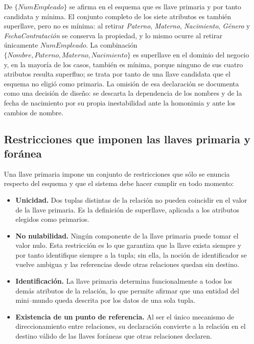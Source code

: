 De $\{N\acute{u}mEmpleado\}$ se afirma en el esquema que es llave primaria y
por tanto candidata y mínima. El conjunto completo de los siete atributos es
también superllave, pero no es mínima: al retirar \emph{Paterno},
\emph{Materno}, \emph{Nacimiento}, \emph{G\'enero} y
\emph{FechaContrataci\'on} se conserva la propiedad, y lo mismo ocurre al
retirar únicamente $N\acute{u}mEmpleado$. La combinación $\{Nombre, Paterno,
Materno, Nacimiento\}$ es superllave en el dominio del negocio y, en la
mayoría de los casos, también es mínima, porque ninguno de sus cuatro
atributos resulta superfluo; se trata por tanto de una llave candidata que el
esquema no eligió como primaria. La omisión de esa declaración se documenta
como una decisión de diseño: se descarta la dependencia de los nombres y de la
fecha de nacimiento por su propia inestabilidad ante la homonimia y ante los
cambios de nombre.

\subsection{Restricciones que imponen las llaves primaria y foránea}

Una llave primaria impone un conjunto de restricciones que sólo se enuncia
respecto del esquema y que el sistema debe hacer cumplir en todo momento:

\begin{itemize}
  \item \textbf{Unicidad.} Dos tuplas distintas de la relación no pueden
    coincidir en el valor de la llave primaria. Es la definición de
    superllave, aplicada a los atributos elegidos como primarios.
  \item \textbf{No nulabilidad.} Ningún componente de la llave primaria puede
    tomar el valor nulo. Esta restricción es lo que garantiza que la llave
    exista siempre y por tanto identifique siempre a la tupla; sin ella, la
    noción de identificador se vuelve ambigua y las referencias desde otras
    relaciones quedan sin destino.
  \item \textbf{Identificación.} La llave primaria determina funcionalmente a
    todos los demás atributos de la relación, lo que permite afirmar que una
    entidad del mini--mundo queda descrita por los datos de una sola tupla.
  \item \textbf{Existencia de un punto de referencia.} Al ser el único
    mecanismo de direccionamiento entre relaciones, su declaración convierte a
    la relación en el destino válido de las llaves foráneas que otras
    relaciones declaren.
\end{itemize}

